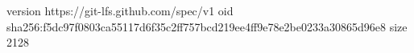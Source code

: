 version https://git-lfs.github.com/spec/v1
oid sha256:f5dc97f0803ca55117d6f35c2ff757bcd219ee4ff9e78e2be0233a30865d96e8
size 2128
